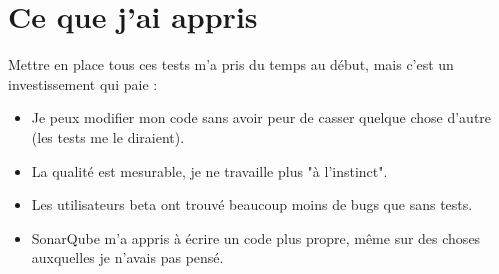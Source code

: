 \section{Ce que j'ai appris}

Mettre en place tous ces tests m'a pris du temps au début, mais c'est un investissement qui paie :

\begin{itemize}
    \item Je peux modifier mon code sans avoir peur de casser quelque chose d'autre (les tests me le diraient).
    \item La qualité est mesurable, je ne travaille plus "à l'instinct".
    \item Les utilisateurs beta ont trouvé beaucoup moins de bugs que sans tests.
    \item SonarQube m'a appris à écrire un code plus propre, même sur des choses auxquelles je n'avais pas pensé.
\end{itemize}